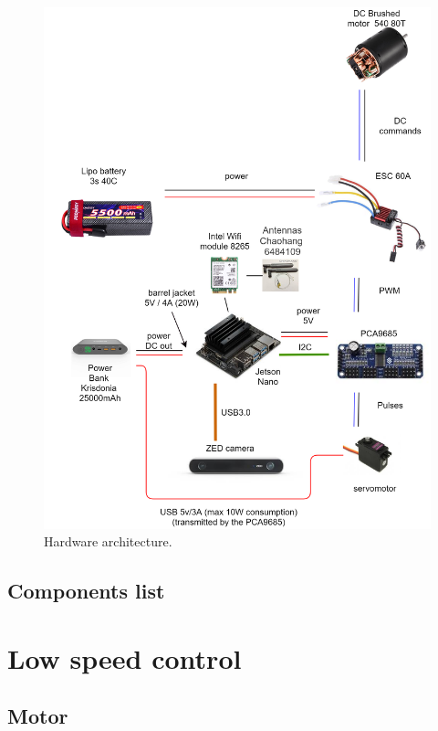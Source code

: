 		\begin{figure}[!htbp]
			\centering
			\includegraphics[width=1.0\columnwidth, height = 1.3\columnwidth]{imgs/hardware.png}
			\caption{Hardware architecture.}
			\label{hardwarepng}
		\end{figure}

		\FloatBarrier

		\subsection{Components list}
		
	\section{Low speed control}\label{motor}
	
		\subsection{Motor}
		
